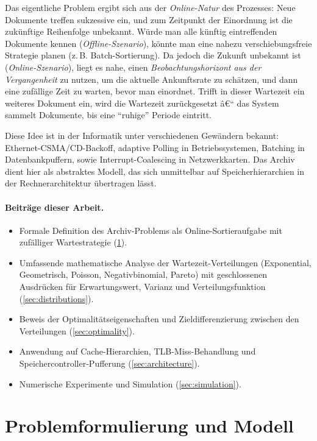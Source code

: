 ﻿\documentclass[12pt, a4paper]{article}
\begin{document}
Das eigentliche Problem ergibt sich aus der \emph{Online-Natur} des Prozesses:
Neue Dokumente treffen sukzessive ein, und zum Zeitpunkt der Einordnung ist
die zukünftige Reihenfolge unbekannt. Würde man alle künftig eintreffenden
Dokumente kennen (\emph{Offline-Szenario}), könnte man eine nahezu
verschiebungsfreie Strategie planen (z.\,B. Batch-Sortierung). Da jedoch die
Zukunft unbekannt ist (\emph{Online-Szenario}), liegt es nahe, einen
\emph{Beobachtungshorizont aus der Vergangenheit} zu nutzen, um die aktuelle
Ankunftsrate zu schätzen, und dann eine zufällige Zeit zu warten, bevor man
einordnet. Trifft in dieser Wartezeit ein weiteres Dokument ein, wird die
Wartezeit zurückgesetzt â€“ das System sammelt Dokumente, bis eine
``ruhige'' Periode eintritt.

Diese Idee ist in der Informatik unter verschiedenen Gewändern bekannt:
Ethernet-CSMA/CD-Backoff, adaptive Polling in Betriebssystemen, Batching in
Datenbankpuffern, sowie Interrupt-Coalescing in Netzwerkkarten. Das Archiv
dient hier als abstraktes Modell, das sich unmittelbar auf Speicherhierarchien
in der Rechnerarchitektur übertragen lässt.

\paragraph{Beiträge dieser Arbeit.}
\begin{itemize}[noitemsep]
  \item Formale Definition des Archiv-Problems als Online-Sortieraufgabe mit
        zufälliger Wartestrategie (\cref{sec:model}).
  \item Umfassende mathematische Analyse der Wartezeit-Verteilungen
        (Exponential, Geometrisch, Poisson, Negativbinomial, Pareto) mit
        geschlossenen Ausdrücken für Erwartungswert, Varianz und
        Verteilungsfunktion (\cref{sec:distributions}).
  \item Beweis der Optimalitätseigenschaften und Zieldifferenzierung zwischen
        den Verteilungen (\cref{sec:optimality}).
  \item Anwendung auf Cache-Hierarchien, TLB-Miss-Behandlung und
        Speichercontroller-Pufferung (\cref{sec:architecture}).
  \item Numerische Experimente und Simulation (\cref{sec:simulation}).
\end{itemize}

\section{Problemformulierung und Modell}\label{sec:model}
\end{document}
